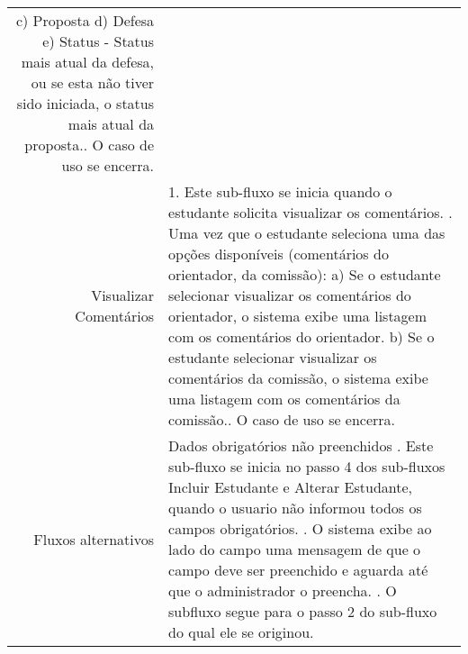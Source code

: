 \begin{longtable}{r p{12cm}}
                     \hspace*{1cm} c) Proposta\newline
                     \hspace*{1cm} d) Defesa\newline
                     \hspace*{1cm} e) Status - Status mais atual da defesa, ou se esta não tiver sido iniciada, o status mais atual da proposta.\newline
                     3. O caso de uso se encerra.\newline     \\ 
Visualizar Comentários & 1. Este sub-fluxo se inicia quando o estudante solicita visualizar os comentários. \newline
                     2. Uma vez que o estudante seleciona uma das opções disponíveis (comentários do orientador, da comissão):\newline
                     \hspace*{1cm} a) Se o estudante selecionar visualizar os comentários do orientador, o sistema exibe uma listagem com os comentários do orientador.\newline
                     \hspace*{1cm} b) Se o estudante selecionar visualizar os comentários da comissão, o sistema exibe uma listagem com os comentários da comissão.\newline
                     3. O caso de uso se encerra.                                        
               \\ \hline
Fluxos alternativos & Dados obrigatórios não preenchidos  \newline
                        1. Este sub-fluxo se inicia no passo 4 dos sub-fluxos Incluir Estudante e Alterar Estudante, quando o usuario não informou todos os campos obrigatórios. \newline
                        2. O sistema exibe ao lado do campo uma mensagem de que o campo deve ser preenchido e aguarda até que o administrador o preencha. \newline
                        3. O subfluxo segue para o passo 2 do sub-fluxo do qual ele se originou. 
                    \\ \hline        
\end{longtable}





